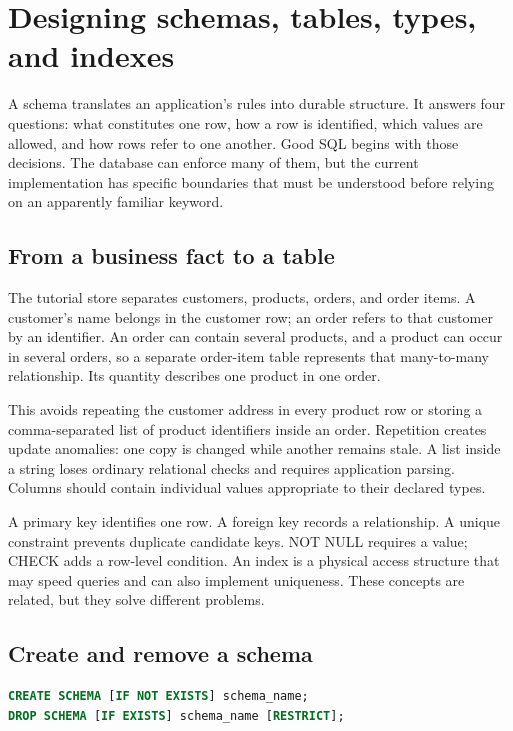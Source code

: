 \chapter{Designing schemas, tables, types, and indexes}
\label{sql:schema}

A schema translates an application's rules into durable structure. It answers four questions: what constitutes one row, how a row is identified, which values are allowed, and how rows refer to one another. Good SQL begins with those decisions. The database can enforce many of them, but the current implementation has specific boundaries that must be understood before relying on an apparently familiar keyword.

\section{From a business fact to a table}

The tutorial store separates customers, products, orders, and order items. A customer's name belongs in the customer row; an order refers to that customer by an identifier. An order can contain several products, and a product can occur in several orders, so a separate order-item table represents that many-to-many relationship. Its quantity describes one product in one order.

This avoids repeating the customer address in every product row or storing a comma-separated list of product identifiers inside an order. Repetition creates update anomalies: one copy is changed while another remains stale. A list inside a string loses ordinary relational checks and requires application parsing. Columns should contain individual values appropriate to their declared types.

A primary key identifies one row. A foreign key records a relationship. A unique constraint prevents duplicate candidate keys. NOT NULL requires a value; CHECK adds a row-level condition. An index is a physical access structure that may speed queries and can also implement uniqueness. These concepts are related, but they solve different problems.

\section{Create and remove a schema}

\begin{lstlisting}[language=SQL]
CREATE SCHEMA [IF NOT EXISTS] schema_name;
DROP SCHEMA [IF EXISTS] schema_name [RESTRICT];
\end{lstlisting}

